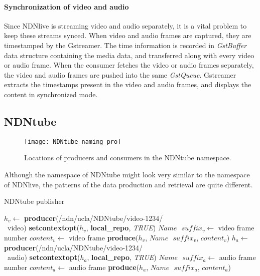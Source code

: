 \paragraph{Synchronization of video and audio}
\vspace{0.1cm}
\label{par:sync}
Since NDNlive is streaming video and audio separately, it is a vital problem to keep these streams synced. When video and audio frames are captured, they are timestamped by the Gstreamer. The time information is recorded in \textit{GstBuffer} data structure containing the media data, and transferred along with every video or audio frame. When the consumer fetches the video or audio frames separately, the video and audio frames are pushed into the same \textit{GstQueue}. Gstreamer extracts the timestamps present in the video and audio frames, and displays the content in synchronized mode. 



\subsection{NDNtube}
\begin{figure*}[ht]
  \centering
  \texttt{[image: NDNtube\_naming\_pro]}
  \caption{Locations of producers and consumers in the NDNtube namespace.}
  \label{fig:NDNtube_cp}
\end{figure*}
Although the namespace of NDNtube might look very similar to the namespace of NDNlive, the patterns of the data production and retrieval are quite different. 

\begin{algorithm}[ht]
\caption{NDNtube publisher}
\label{alg:recordproducer}
\begin{algorithmic}[3]
\State $h_v \leftarrow $ \textbf{producer}(/ndn/ucla/NDNtube/video-1234/ \\\ video)
\State \textbf{setcontextopt}($h_v$, \textbf{local\_repo}, \textit{TRUE})
\vspace{0.2cm}
	\State $Name \textbf{ } suffix_v \leftarrow $ video frame number
	\State $content_v \leftarrow $ video frame
	\State \textbf{produce}($h_v$, $Name\textbf{ }suffix_v$, $content_v$)
	\EndWhile
\vspace{0.2cm}
\vspace{0.2cm}
\State $h_a \leftarrow $ \textbf{producer}(/ndn/ucla/NDNtube/video-1234/ \\\ audio)
\State \textbf{setcontextopt}($h_a$, \textbf{local\_repo}, \textit{TRUE})
\vspace{0.2cm}
	\State $Name \textbf{ } suffix_a \leftarrow $ audio frame number
	\State $content_a \leftarrow $ audio frame
	\State \textbf{produce}($h_a$, $Name\textbf{ }suffix_a$, $content_a$)
	\EndWhile
\end{algorithmic}
\end{algorithm}

